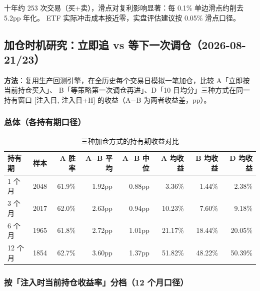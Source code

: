 \documentclass[11pt]{ctexart}
\newcommand{\pos}[1]{\textcolor{poscol}{#1}}   %
\begin{document}
十年约 253 次交易（买+卖），滑点对复利影响显著：每 0.1\% 单边滑点约削去 5.2pp 年化。
ETF 实际冲击成本接近零，实盘评估建议按 0.05\% 滑点口径。

\subsection{加仓时机研究：立即追 vs 等下一次调仓（2026-08-21/23）}

\textbf{方法}：复用生产回测引擎，在全历史每个交易日模拟一笔加仓，比较 A「立即按当前持仓买入」、
B「等策略第一次调仓再进」、D「10 日均分」三种方式在同一持有窗口 [注入日, 注入日+H] 的收益（A$-$B 为两者收益差，pp）。

\subsubsection{总体（各持有期口径）}

\begin{table}[htbp]
\centering
\caption{三种加仓方式的持有期收益对比}
\footnotesize
\setlength{\tabcolsep}{3.8pt}
\begin{tabular}{lrrrrrrr}
\toprule
持有期 & 样本 & A 胜率 & A$-$B 平均 & A$-$B 中位 & A 均收益 & B 均收益 & D 均收益 \\
\midrule
1 个月 & 2048 & 61.9\% & \pos{1.92pp} & 0.88pp & 3.36\% & 1.44\% & 2.38\% \\
3 个月 & 2017 & 62.0\% & \pos{2.63pp} & 0.94pp & 10.23\% & 7.60\% & 9.18\% \\
6 个月 & 1965 & 61.8\% & \pos{2.72pp} & 1.01pp & 21.17\% & 18.44\% & 20.05\% \\
12 个月 & 1854 & 62.7\% & \pos{3.60pp} & 1.37pp & 51.82\% & 48.22\% & 50.39\% \\
\bottomrule
\end{tabular}
\end{table}

\subsubsection{按「注入时当前持仓收益率」分档（12 个月口径）}
\end{document}
